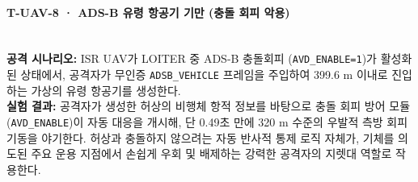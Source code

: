 \paragraph{\textbf{T-UAV-8 · ADS-B 유령 항공기 기만 (충돌 회피 악용)}} ~\\
\textbf{공격 시나리오:} ISR UAV가 LOITER 중 ADS-B 충돌회피 (\texttt{AVD\_ENABLE=1})가 활성화된 상태에서, 공격자가 무인증 \texttt{ADSB\_VEHICLE} 프레임을 주입하여 399.6 m 이내로 진입하는 가상의 유령 항공기를 생성한다.\\
\textbf{실험 결과:} 
공격자가 생성한 허상의 비행체 항적 정보를 바탕으로 충돌 회피 방어 모듈 (\texttt{AVD\_ENABLE})이 자동 대응을 개시해, 단 0.49초 만에 320 m 수준의 우발적 측방 회피 기동을 야기한다. 허상과 충돌하지 않으려는 자동 반사적 통제 로직 자체가, 기체를 의도된 주요 운용 지점에서 손쉽게 우회 및 배제하는 강력한 공격자의 지렛대 역할로 작용한다.
